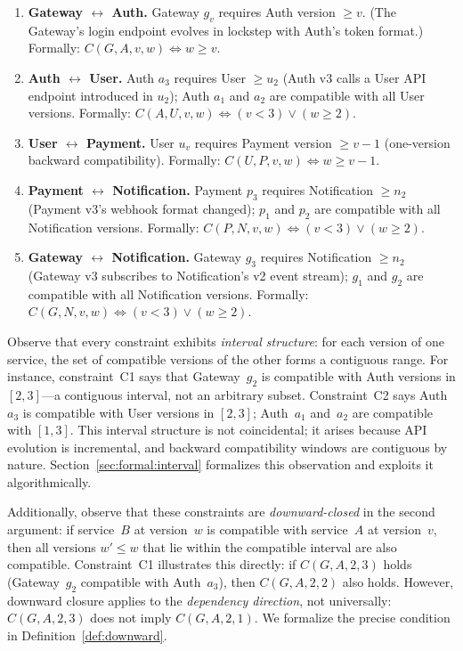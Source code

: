 \documentclass[10pt,twocolumn]{article}
\begin{document}
\begin{enumerate}
\renewcommand{\labelenumi}{C\arabic{enumi}.}
\item \label{c:ga} \textbf{Gateway $\leftrightarrow$ Auth.}
  Gateway $g_v$ requires Auth version $\geq v$.
  (The Gateway's login endpoint evolves in lockstep with Auth's token
  format.)
  Formally: $C(G,A,v,w) \iff w \geq v$.

\item \label{c:au} \textbf{Auth $\leftrightarrow$ User.}
  Auth $a_3$ requires User $\geq u_2$ (Auth v3 calls a User API endpoint
  introduced in $u_2$); Auth $a_1$ and $a_2$ are compatible with all User
  versions.
  Formally: $C(A,U,v,w) \iff (v < 3) \lor (w \geq 2)$.

\item \label{c:up} \textbf{User $\leftrightarrow$ Payment.}
  User $u_v$ requires Payment version $\geq v - 1$ (one-version backward
  compatibility).
  Formally: $C(U,P,v,w) \iff w \geq v - 1$.

\item \label{c:pn} \textbf{Payment $\leftrightarrow$ Notification.}
  Payment $p_3$ requires Notification $\geq n_2$ (Payment v3's webhook
  format changed); $p_1$ and $p_2$ are compatible with all Notification
  versions.
  Formally: $C(P,N,v,w) \iff (v < 3) \lor (w \geq 2)$.

\item \label{c:gn} \textbf{Gateway $\leftrightarrow$ Notification.}
  Gateway $g_3$ requires Notification $\geq n_2$ (Gateway v3 subscribes to
  Notification's v2 event stream); $g_1$ and $g_2$ are compatible with
  all Notification versions.
  Formally: $C(G,N,v,w) \iff (v < 3) \lor (w \geq 2)$.
\end{enumerate}

\noindent
Observe that every constraint exhibits \emph{interval structure}: for each
version of one service, the set of compatible versions of the other forms a
contiguous range.  For instance, constraint~C1 says that Gateway~$g_2$ is
compatible with Auth versions in $[2,3]$---a contiguous interval, not an
arbitrary subset.  Constraint~C2 says Auth~$a_3$ is compatible with User
versions in $[2,3]$; Auth~$a_1$ and~$a_2$ are compatible with $[1,3]$.
This interval structure is not coincidental; it arises because API
evolution is incremental, and backward compatibility windows are contiguous
by nature.  Section~\ref{sec:formal:interval} formalizes this observation
and exploits it algorithmically.

Additionally, observe that these constraints are \emph{downward-closed} in
the second argument: if service~$B$ at version~$w$ is compatible with
service~$A$ at version~$v$, then all versions $w' \leq w$ that lie within
the compatible interval are also compatible.  Constraint~C1 illustrates
this directly: if $C(G,A,2,3)$ holds (Gateway~$g_2$ compatible with
Auth~$a_3$), then $C(G,A,2,2)$ also holds.  However, downward closure
applies to the \emph{dependency direction}, not universally: $C(G,A,2,3)$
does not imply $C(G,A,2,1)$.  We formalize the precise condition in
Definition~\ref{def:downward}.
\end{document}
